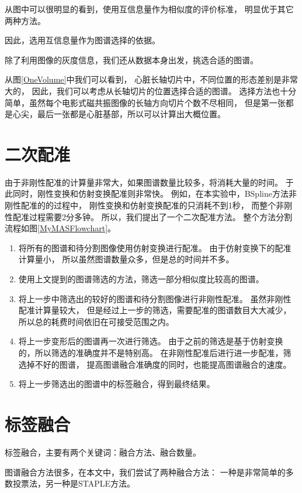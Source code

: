 从图中可以很明显的看到，使用互信息量作为相似度的评价标准，
明显优于其它两种方法。

因此，选用互信息量作为图谱选择的依据。

除了利用图像的灰度信息，我们还从数据本身出发，挑选合适的图谱。

从图\ref{OneVolume}中我们可以看到，
心脏长轴切片中，不同位置的形态差别是非常大的，
因此，我们可以考虑从长轴切片的位置选择合适的图谱。
选择方法也十分简单，虽然每个电影式磁共振图像的长轴方向切片个数不尽相同，
但是第一张都是心尖，最后一张都是心脏基部，所以可以计算出大概位置。


\section{二次配准}
由于非刚性配准的计算量非常大，如果图谱数量比较多，将消耗大量的时间。
于此同时，刚性变换和仿射变换配准则非常快。
例如，在本实验中，BSpline方法非刚性配准的的过程中，
刚性变换和仿射变换配准的只消耗不到1秒，
而整个非刚性配准过程需要2分多钟。
所以，我们提出了一个二次配准方法。
整个方法分割流程如图\ref{MyMASFlowchart}。
\begin{enumerate}
  \item 将所有的图谱和待分割图像使用仿射变换进行配准。
    由于仿射变换下的配准计算量小，
    所以虽然图谱数量众多，但是总的时间并不多。
  \item 使用上文提到的图谱筛选的方法，筛选一部分相似度比较高的图谱。
  \item 将上一步中筛选出的较好的图谱和待分割图像进行非刚性配准。
    虽然非刚性配准计算量较大，
    但是经过上一步的筛选，需要配准的图谱数目大大减少，
    所以总的耗费时间依旧在可接受范围之内。
  \item 将上一步变形后的图谱再一次进行筛选。
    由于之前的筛选是基于仿射变换的，所以筛选的准确度并不是特别高。
    在非刚性配准后进行进一步配准，筛选掉不好的图谱，
    提高图谱融合准确度的同时，也能提高图谱融合的速度。
  \item 将上一步筛选出的图谱中的标签融合，得到最终结果。
\end{enumerate}


\section{标签融合}

标签融合，主要有两个关键词：融合方法、融合数量。

图谱融合方法很多，在本文中，我们尝试了两种融合方法：
一种是非常简单的多数投票法，另一种是STAPLE方法。

